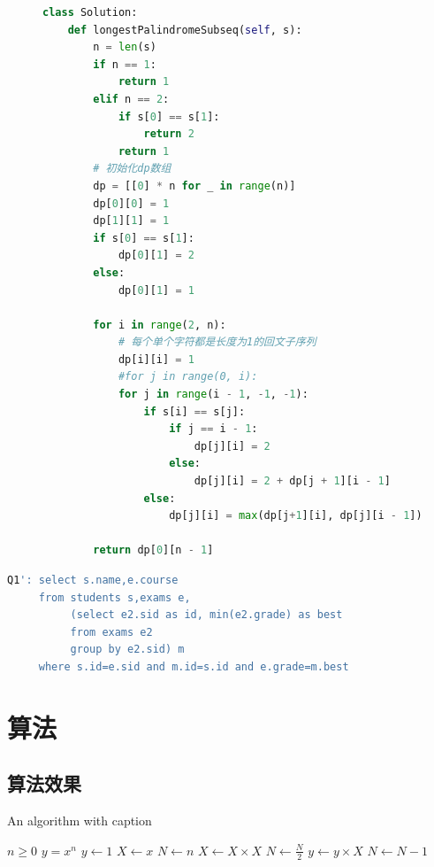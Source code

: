 \documentclass[math,logic,quote,code,mode=simple]{codedumpnote}
\begin{document}
\begin{figure}[htp]
\begin{lstlisting}[language=PYTHON,caption={最长回文子序列解法一}]
class Solution:
    def longestPalindromeSubseq(self, s):
        n = len(s)
        if n == 1:
            return 1
        elif n == 2:
            if s[0] == s[1]:
                return 2
            return 1
        # 初始化dp数组
        dp = [[0] * n for _ in range(n)]
        dp[0][0] = 1
        dp[1][1] = 1
        if s[0] == s[1]:
            dp[0][1] = 2
        else:
            dp[0][1] = 1
        
        for i in range(2, n):
            # 每个单个字符都是长度为1的回文子序列
            dp[i][i] = 1
            #for j in range(0, i):
            for j in range(i - 1, -1, -1):
                if s[i] == s[j]:
                    if j == i - 1:
                        dp[j][i] = 2
                    else:
                        dp[j][i] = 2 + dp[j + 1][i - 1]
                else:
                    dp[j][i] = max(dp[j+1][i], dp[j][i - 1])

        return dp[0][n - 1]
\end{lstlisting}
\end{figure}

\begin{lstlisting}[language=SQL,caption={优化后的依赖连接示例}]
Q1': select s.name,e.course
	 from students s,exams e, 
	 	  (select e2.sid as id, min(e2.grade) as best 
	 	  from exams e2 
	 	  group by e2.sid) m
	 where s.id=e.sid and m.id=s.id and e.grade=m.best
\end{lstlisting}

\chapter{算法}

\section{算法效果}

\begin{algorithm}
\caption{An algorithm with caption}\label{alg:cap}
\begin{algorithmic}
\Require $n \geq 0$
\Ensure $y = x^n$
\State $y \gets 1$
\State $X \gets x$
\State $N \gets n$
    \State $X \gets X \times X$
    \State $N \gets \frac{N}{2}$  
    \State $y \gets y \times X$
    \State $N \gets N - 1$
\EndIf
\EndWhile
\end{algorithmic}
\end{algorithm}
\end{document}
